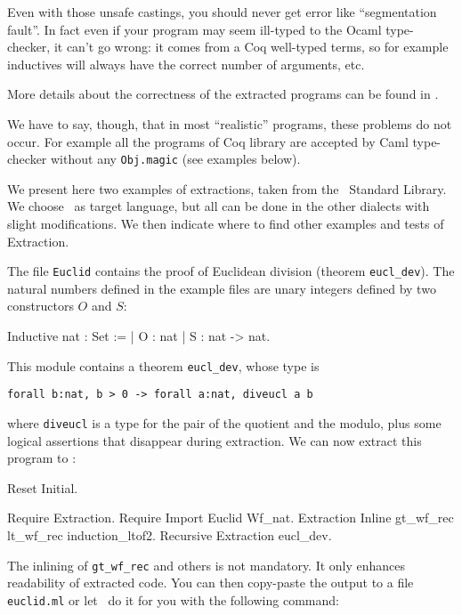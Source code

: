 \noindent Even with those unsafe castings, you should never get error like
``segmentation fault''. In fact even if your program may seem
ill-typed to the Ocaml type-checker, it can't go wrong: it comes 
from a Coq well-typed terms, so for example inductives will always 
have the correct number of arguments, etc. 

More details about the correctness of the extracted programs can be 
found in \cite{Let02}.

We have to say, though, that in most ``realistic'' programs, these
problems do not occur. For example all the programs of Coq library are
accepted by Caml type-checker without any {\tt Obj.magic} (see examples below).




We present here two examples of extractions, taken from the 
\Coq\ Standard Library. We choose \ocaml\ as target language, 
but all can be done in the other dialects with slight modifications.
We then indicate where to find other examples and tests of Extraction.


The file {\tt Euclid} contains the proof of Euclidean division
(theorem {\tt eucl\_dev}). The natural numbers defined in the example
files are unary integers defined by two constructors $O$ and $S$:
\begin{coq_example*}
Inductive nat : Set :=
  | O : nat
  | S : nat -> nat.
\end{coq_example*}

\noindent This module contains a theorem {\tt eucl\_dev}, whose type is
\begin{verbatim}
forall b:nat, b > 0 -> forall a:nat, diveucl a b
\end{verbatim}
where {\tt diveucl} is a type for the pair of the quotient and the
modulo, plus some logical assertions that disappear during extraction.
We can now extract this program to \ocaml:

\begin{coq_eval}
Reset Initial.
\end{coq_eval}
\begin{coq_example}
Require Extraction.
Require Import Euclid Wf_nat.
Extraction Inline gt_wf_rec lt_wf_rec induction_ltof2.
Recursive Extraction eucl_dev.
\end{coq_example}

\noindent The inlining of {\tt gt\_wf\_rec} and others is not
mandatory. It only enhances readability of extracted code.
You can then copy-paste the output to a file {\tt euclid.ml} or let 
\Coq\ do it for you with the following command: 

